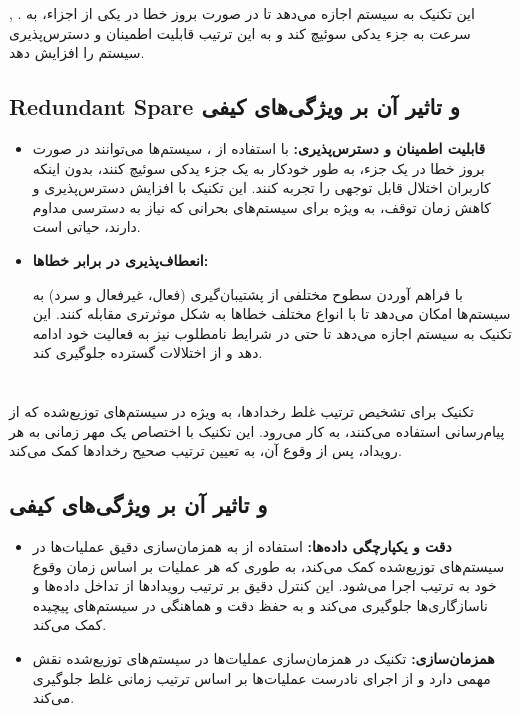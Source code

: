 , .
این تکنیک به سیستم اجازه می‌دهد تا در صورت بروز خطا در یکی از اجزاء، به سرعت به جزء یدکی سوئیچ کند و به این ترتیب قابلیت اطمینان و دسترس‌پذیری سیستم را افزایش دهد.

\subsection*{Redundant Spare و تاثیر آن بر ویژگی‌های کیفی}
\begin{itemize} 
	\item \textbf{قابلیت اطمینان و دسترس‌پذیری:} 
	با استفاده از  ، سیستم‌ها می‌توانند در صورت بروز خطا در یک جزء، به طور خودکار به یک جزء یدکی سوئیچ کنند، بدون اینکه کاربران اختلال قابل توجهی را تجربه کنند. این تکنیک با افزایش دسترس‌پذیری و کاهش زمان توقف، به ویژه برای سیستم‌های بحرانی که نیاز به دسترسی مداوم دارند، حیاتی است.
	
	
	\item \textbf{انعطاف‌پذیری در برابر خطاها:} 
	
	 با فراهم آوردن سطوح مختلفی از پشتیبان‌گیری (فعال، غیرفعال و سرد) به سیستم‌ها امکان می‌دهد تا با انواع مختلف خطاها به شکل موثرتری مقابله کنند. این تکنیک به سیستم اجازه می‌دهد تا حتی در شرایط نامطلوب نیز به فعالیت خود ادامه دهد و از اختلالات گسترده جلوگیری کند.
\end{itemize}

\section{}
تکنیک
 برای تشخیص ترتیب غلط رخدادها، به ویژه در سیستم‌های توزیع‌شده که از پیام‌رسانی استفاده می‌کنند، به کار می‌رود. این تکنیک با اختصاص یک مهر زمانی به هر رویداد، پس از وقوع آن، به تعیین ترتیب صحیح رخدادها کمک می‌کند.

\subsection*{ و تاثیر آن بر ویژگی‌های کیفی}
\begin{itemize}
	\item \textbf{دقت و یکپارچگی داده‌ها:} استفاده از 
به همزمان‌سازی دقیق عملیات‌ها در سیستم‌های توزیع‌شده کمک می‌کند، به طوری که هر عملیات بر اساس زمان وقوع خود به ترتیب اجرا می‌شود. این کنترل دقیق بر ترتیب رویدادها از تداخل داده‌ها و ناسازگاری‌ها جلوگیری می‌کند و به حفظ دقت و هماهنگی در سیستم‌های پیچیده کمک می‌کند.

	\item \textbf{همزمان‌سازی:} تکنیک 
	در همزمان‌سازی عملیات‌ها در سیستم‌های توزیع‌شده نقش مهمی دارد و از اجرای نادرست عملیات‌ها بر اساس ترتیب زمانی غلط جلوگیری می‌کند.
\end{itemize}

